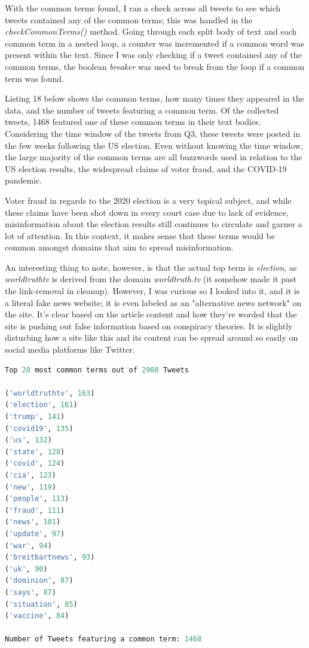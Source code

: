 \documentclass[12pt]{article}
\begin{document}
\par With the common terms found, I ran a check across all tweets to see which tweets contained any of the common terms; this was handled in the \emph{checkCommonTerms()} method. Going through each split body of text and each common term in a nested loop, a counter was incremented if a common word was present within the text. Since I was only checking if a tweet contained any of the common terms, the boolean \emph{breaker} was used to break from the loop if a common term was found.



Listing 18 below shows the common terms, how many times they appeared in the data, and the number of tweets featuring a common term. Of the collected tweets, 1468 featured one of these common terms in their text bodies. Considering the time window of the tweets from Q3, these tweets were posted in the few weeks following the US election. Even without knowing the time window, the large majority of the common terms are all buzzwords used in relation to the US election results, the widespread claims of voter fraud, and the COVID-19 pandemic. 

\par Voter fraud in regards to the 2020 election is a very topical subject, and while these claims have been shot down in every court case due to lack of evidence, misinformation about the election results still continues to circulate and garner a lot of attention. In this context, it makes sense that these terms would be common amongst domains that aim to spread misinformation. 

\par An interesting thing to note, however, is that the actual top term is \emph{election}, as \emph{worldtruthtv} is derived from the domain \emph{worldtruth.tv} (it somehow made it past the link-removal in cleanup). However, I was curious so I looked into it, and it is a literal fake news website; it is even labeled as an "alternative news network" on the site. It's clear based on the article content and how they're worded that the site is pushing out false information based on conspiracy theories. It is slightly disturbing how a site like this and its content can be spread around so easily on social media platforms like Twitter. 

\begin{lstlisting}[language=Python, caption={Most common terms across gathered tweets, ordered by number of tweets they appeared in}, label=lst:copy]
Top 20 most common terms out of 2908 Tweets

('worldtruthtv', 163)
('election', 161)
('trump', 141)
('covid19', 135)
('us', 132)
('state', 128)
('covid', 124)
('cia', 123)
('new', 119)
('people', 113)
('fraud', 111)
('news', 101)
('update', 97)
('war', 94)
('breitbartnews', 93)
('uk', 90)
('dominion', 87)
('says', 87)
('situation', 85)
('vaccine', 84)

Number of Tweets featuring a common term: 1468
\end{lstlisting}
\end{document}
